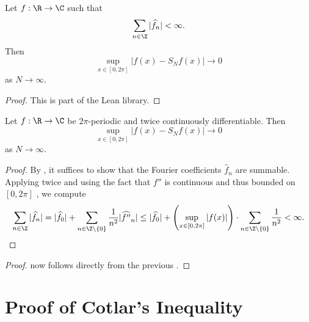 \begin{lemma}
\label{convergence-of-coeffs-summable}
\leanok
Let $f:\R \to \C$ such that
\begin{equation}
    \sum_{n\in \Z} |\widehat{f}_n| < \infty.
\end{equation}
Then
\begin{equation}
    \sup_{x\in [0,2\pi]} |f(x) - S_Nf(x)| \rightarrow 0
\end{equation}
as $N \rightarrow \infty$.
\end{lemma}

\begin{proof}
\leanok
    This is part of the Lean library.
\end{proof}

\begin{lemma}
    \label{convergence-for-twice-contdiff}
    \leanok
    Let $f:\R \to \C$ be $2\pi$-periodic and twice continuously differentiable. Then
    \begin{equation}
        \sup_{x\in [0,2\pi]} |f(x) - S_Nf(x)| \rightarrow 0
    \end{equation}
    as $N \rightarrow \infty$.
\end{lemma}
\begin{proof}
\leanok
By , it suffices to show that the Fourier coefficients $\widehat{f}_n$ are summable.
Applying  twice and using the fact that $f''$ is continuous and thus bounded on $[0,2\pi]$ , we compute
\begin{equation*}
    \sum_{n\in \Z} |\widehat{f}_n| = |\widehat{f}_0| + \sum_{n\in \Z \setminus \{0\}} \frac {1}{n^2} |\widehat{f''}_n|
    \le |\widehat{f}_0| + \left(\sup_{x\in [0,2\pi]} |f(x)| \right) \cdot \sum_{n\in \Z \setminus \{0\}} \frac {1}{n^2}
    < \infty.
\end{equation*}
\end{proof}

\begin{proof}
\leanok
{}
     now follows directly from the previous .
\end{proof}

\section{Proof of Cotlar's Inequality}
\label{subsec-cotlar}




